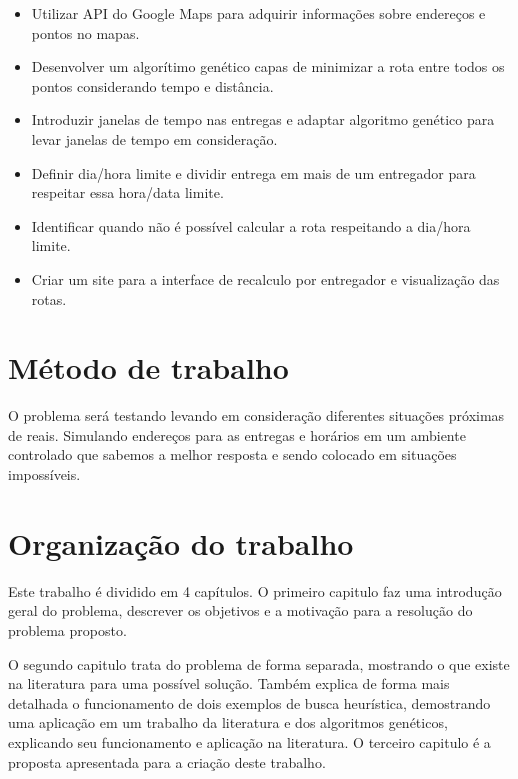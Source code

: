 \begin{itemize}
	\item Utilizar API do Google Maps para adquirir informações sobre endereços e pontos no mapas.
	\item Desenvolver um algorítimo genético capas de minimizar a rota entre todos os pontos considerando tempo e distância.
	\item Introduzir janelas de tempo nas entregas e adaptar algoritmo genético para levar janelas de tempo em consideração.
	\item Definir dia/hora limite e dividir entrega em mais de um entregador para respeitar essa hora/data limite. 
	\item Identificar quando não é possível calcular a rota respeitando a dia/hora limite.
	\item Criar um site para a interface de recalculo por entregador e visualização das rotas.
\end{itemize}


\section{Método de trabalho}
O problema será testando levando em consideração diferentes situações próximas de reais.
Simulando endereços para as entregas e horários em um  ambiente controlado que sabemos a melhor resposta e sendo colocado em situações impossíveis. 

\section{Organização do trabalho}
Este trabalho é dividido em 4 capítulos. O primeiro capitulo faz uma introdução geral do problema, descrever os objetivos e a motivação para a resolução do problema proposto.

O segundo capitulo trata do problema de forma separada, mostrando o que existe na literatura para uma possível solução. Também explica de forma mais detalhada o funcionamento de dois exemplos de busca heurística, demostrando uma aplicação em um trabalho da literatura e dos algoritmos genéticos, explicando seu funcionamento e aplicação na literatura.
O terceiro capitulo é a proposta apresentada para a criação deste trabalho.

